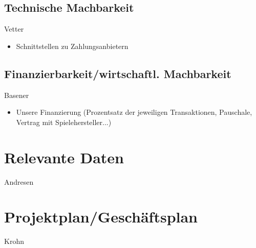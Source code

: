 \documentclass[a4paper,10pt]{article}
\begin{document}
\subsection{Technische Machbarkeit}
Vetter
\begin{itemize}
  \item Schnittstellen zu Zahlungsanbietern
\end{itemize}

\subsection{Finanzierbarkeit/wirtschaftl. Machbarkeit}
Basener
\begin{itemize}
  \item Unsere Finanzierung (Prozentsatz der jeweiligen Transaktionen, Pauschale, Vertrag mit Spielehersteller...)
\end{itemize}

\section{Relevante Daten}
Andresen

\section{Projektplan/Geschäftsplan}
Krohn
\end{document}
